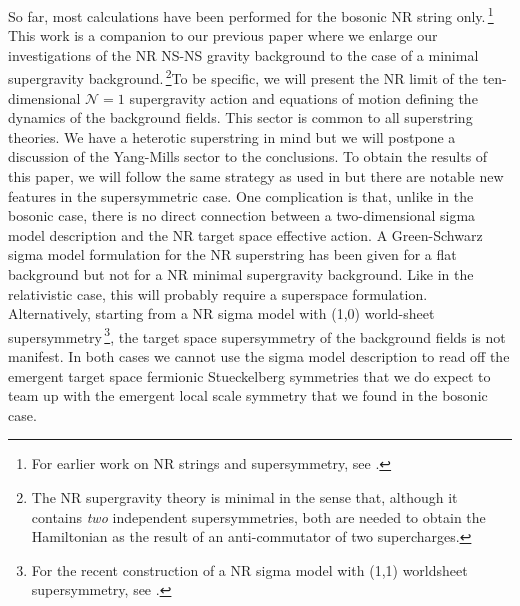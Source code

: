 \documentclass[a4paper,10pt,openany]{article}
\begin{document}
	
	So far, most calculations have been performed for the bosonic NR string only.\,\footnote{For earlier work on NR strings and supersymmetry, see \cite{Gomis:2004pw,Gomis:2005pg}.} This work is a companion to our previous paper where we enlarge our investigations of the NR NS-NS gravity background to the case of a minimal supergravity background.\,\footnote{The NR supergravity theory is minimal in the sense that, although it contains {\it two} independent supersymmetries, both are needed to obtain the Hamiltonian as the result of an anti-commutator of two supercharges.}To be specific, we will present the  NR limit of the ten-dimensional  $\mathcal{N}=1$  supergravity action and equations of motion defining  the dynamics of the background fields. This sector is common to all superstring theories. We have a heterotic superstring in mind but we will postpone a discussion of the Yang-Mills sector to the conclusions. To obtain the results of this paper, we will follow the same strategy as used in \cite{Bergshoeff:2021bmc} but there are notable new features in the supersymmetric case. One complication is that, unlike in the bosonic case, there is no direct connection between a two-dimensional sigma model description and the NR target space effective action. A Green-Schwarz sigma model formulation for the  NR superstring has been given for a flat background \cite{Gomis:2004pw} but not for a NR minimal supergravity background. Like in the relativistic case, this will probably require a superspace formulation. Alternatively, starting from a NR  sigma model with (1,0) world-sheet supersymmetry\,\footnote{For the recent construction of a NR sigma model with (1,1) worldsheet supersymmetry, see \cite{Blair:2019qwi}.}, the target space supersymmetry of the background fields is not manifest. In both cases we cannot use the sigma model description to read off   the  emergent  target space fermionic Stueckelberg symmetries that we do expect to team up with the emergent local scale symmetry that we found in the bosonic case.
	
\end{document}

